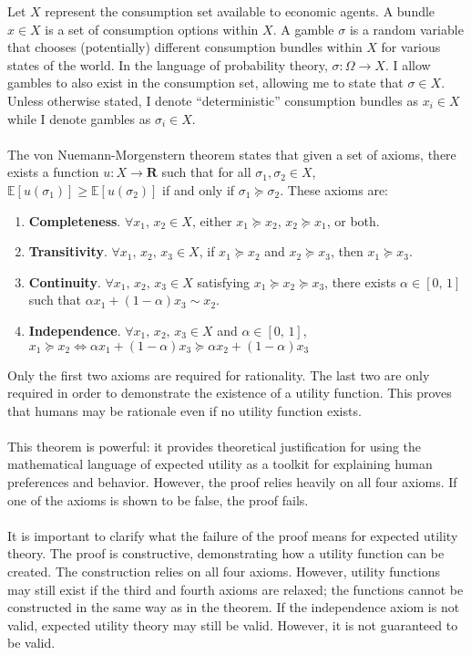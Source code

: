 \documentclass{article}
\begin{document}
Let \(X\) represent the consumption set available to economic agents.  A bundle \(x \in X\) is a set of consumption options within \(X\).  A gamble \(\sigma\) is a random variable that chooses (potentially) different consumption bundles within \(X\) for various states of the world.  In the language of probability theory, \(\sigma: \Omega \to X\).  I allow gambles to also exist in the consumption set, allowing me to state that \(\sigma \in X\).  Unless otherwise stated, I denote ``deterministic'' consumption bundles as \(x_i \in X\) while I denote gambles as \(\sigma_i \in X\).     
\\
\\
The von Nuemann-Morgenstern theorem states that given a set of axioms, there exists a function \(u: X \to \mathbf{R}\) such that for all \(\sigma_1, \sigma_2 \in X\), \(\mathbb{E}\left[u(\sigma_1)\right] \geq \mathbb{E}\left[u(\sigma_2)\right]\) if and only if \(\sigma_1 \succeq  \sigma_2\).  These axioms are:

\begin{enumerate}
	\item \textbf{Completeness}.  \(\forall x_1, \, x_2 \in X\), either \(x_1 \succeq  x_2\), \(x_2 \succeq  x_1\), or both.
	\item \textbf{Transitivity}.  \(\forall x_1, \, x_2,\, x_3 \in X\), if \(x_1 \succeq  x_2\) and \(x_2 \succeq  x_3\), then \(x_1 \succeq  x_3\).
	\item \textbf{Continuity}.  \(\forall x_1, \, x_2,\,x_3 \in X\) satisfying \(x_1 \succeq  x_2 \succeq  x_3\), there exists \(\alpha \in [0,\,1]\) such that \(\alpha x_1+(1-\alpha) x_3 \sim x_2\).
	\item \textbf{Independence}.  \(\forall x_1, \, x_2,\,x_3 \in X\) and \(\alpha \in [0,\,1]\), \(x_1 \succeq  x_2 \Leftrightarrow \alpha x_1+(1-\alpha)x_3 \succeq  \alpha x_2 +(1-\alpha)x_3\)
\end{enumerate}

Only the first two axioms are required for rationality.  The last two are only required in order to demonstrate the existence of a utility function.  This proves that humans may be rationale even if no utility function exists.  
\\
\\
This theorem is powerful: it provides theoretical justification for using the mathematical language of expected utility as a toolkit for explaining human preferences and behavior.  However, the proof relies heavily on all four axioms.  If one of the axioms is shown to be false, the proof fails.  
\\
\\
It is important to clarify what the failure of the proof means for expected utility theory. The proof is constructive, demonstrating how a utility function can be created.  The construction relies on all four axioms.  However, utility functions may still exist if the third and fourth axioms are relaxed; the functions cannot be constructed in the same way as in the theorem.  If the independence axiom is not valid, expected utility theory may still be valid.  However, it is not guaranteed to be valid.  
 
\end{document}
